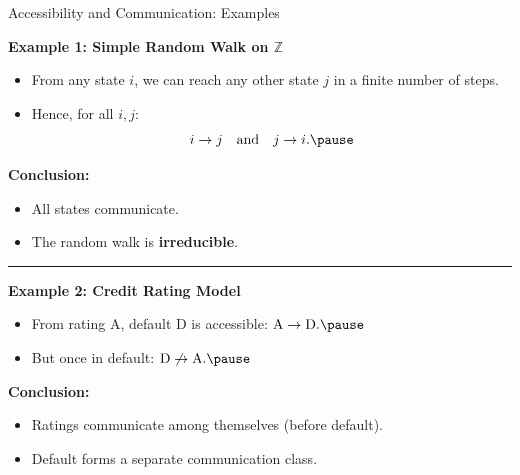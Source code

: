 \documentclass[aspectratio=169]{beamer}
\begin{document}
\begin{frame}{Accessibility and Communication: Examples}

\textbf{Example 1: Simple Random Walk on $\mathbb{Z}$}

\begin{itemize}
  \item From any state $i$, we can reach any other state $j$ in a finite number of steps.\pause
  \item Hence, for all $i,j$:
  \vspace{-5mm}
  \[
  i \to j \quad \text{and} \quad j \to i.\pause
  \vspace{-6mm}
  \]
\end{itemize}

\medskip
\textbf{Conclusion:}
\vspace{-2mm}
\begin{itemize}
  \item All states communicate.\pause
  \item The random walk is \textbf{irreducible}.
\end{itemize}

\medskip
\hrule

\textbf{Example 2: Credit Rating Model}

\begin{itemize}
  \item From rating $\text{A}$, default $\text{D}$ is accessible:
  $
  \text{A} \to \text{D}.\pause
  $
  \item But once in default:
  $
  \text{D} \not\to \text{A}.\pause
  $
  \vspace{-3mm}
\end{itemize}

\medskip
\textbf{Conclusion:}
\vspace{-2mm}
\begin{itemize}
  \item Ratings communicate among themselves (before default).\pause
  \item Default forms a separate communication class.
\end{itemize}

\end{frame}
\end{document}

